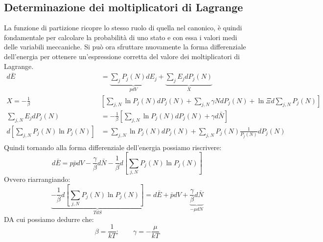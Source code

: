 \documentclass[oneside]{amsbook}
\numberwithin{section}{chapter}
\numberwithin{equation}{section}
\numberwithin{figure}{section}
\begin{document}
\subsection{Determinazione dei moltiplicatori di Lagrange}
La funzione di partizione ricopre lo stesso ruolo di quella nel canonico, è quindi fondamentale per calcolare la probabilità di uno stato e con essa i valori medi delle variabili meccaniche.
Si può ora sfruttare nuovamente la forma differenziale dell'energia per ottenere un'espressione corretta del valore dei moltiplicatori di Lagrange. 
\begin{equation}
\begin{aligned}
d\bar{E} &= \underbrace{\sum_j P_j (N) dE_j}_{pdV}+\underbrace{\sum_j E_j dP_j(N)}_{X} \\
X= -\frac{1}{\beta}&\left[ \sum_{j,N} \ln P_j(N)dP_j(N) + \sum_{j,N}\gamma N d P_j(N)+\ln \Xi d \sum_{j,N}P_j (N)\right] \\
\sum_{j,N} E_j dP_j (N) &=-\frac{1}{\beta}\left[ \sum_{j,N} \ln P_j(N)dP_j(N) + \gamma  d \bar{N}\right]\\
d\left[ \sum_{j,N}P_j(N) \ln P_j(N)\right]&= \sum_{j,N} \ln P_j(N)dP_j(N) + \sum_{j,N}P_j(N)\frac{1}{P_j(N)} dP_j(N)\\
\end{aligned}
\end{equation}
Quindi tornando alla forma differenziale dell'energia possiamo riscrivere:
\begin{equation}
d\bar{E }= p\bar{p}dV-\frac{\gamma}{\beta}d\bar{N }- \frac{1}{\beta} d \left[ \sum_{j,N}P_j(N) \ln P_j(N)\right]
\end{equation}
Ovvero riarrangiando:
\begin{equation}
\underbrace{- \frac{1}{\beta} d \left[ \sum_{j,N}P_j(N) \ln P_j(N)\right]}_{TdS}=d\bar{E}+\bar{p}dV+\underbrace{\frac{\gamma}{\beta}d\bar{N}}_{-\mu dN}
\end{equation}
DA cui possiamo dedurre che:
\begin{equation}
\beta=\frac{1}{kT};\quad \quad \gamma= -\frac{\mu}{kT}
\end{equation}
\end{document}
